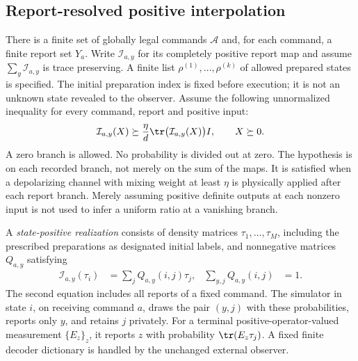 \subsection{Report-resolved positive interpolation}
There is a finite set of globally legal commands $\mathcal A$ and, for each command, a finite report set $Y_a$. Write $\mathcal I_{a,y}$ for its completely positive report map and assume $\sum_y\mathcal I_{a,y}$ is trace preserving. A finite list $\rho^{(1)},\ldots,\rho^{(k)}$ of allowed prepared states is specified. The initial preparation index is fixed before execution; it is not an unknown state revealed to the observer. Assume the following unnormalized inequality for every command, report and positive input:
\begin{equation}\label{eq:r68-branch-floor}
 \mathcal I_{a,y}(X)\succeq
       \frac{\eta}{d}\tr\bigl(\mathcal I_{a,y}(X)\bigr)I,
 \qquad X\succeq0.
\end{equation}
A zero branch is allowed. No probability is divided out at zero. The hypothesis is on each recorded branch, not merely on the sum of the maps. It is satisfied when a depolarizing channel with mixing weight at least $\eta$ is physically applied after each report branch. Merely assuming positive definite outputs at each nonzero input is not used to infer a uniform ratio at a vanishing branch.

A \emph{state-positive realization} consists of density matrices $\tau_1,\ldots,\tau_M$, including the prescribed preparations as designated initial labels, and nonnegative matrices $Q_{a,y}$ satisfying
\begin{align}
 \mathcal I_{a,y}(\tau_i)&=\sum_jQ_{a,y}(i,j)\tau_j,
       &\sum_{y,j}Q_{a,y}(i,j)&=1.\label{eq:r68-intertwining}
\end{align}
The second equation includes all reports of a fixed command. The simulator in state $i$, on receiving command $a$, draws the pair $(y,j)$ with these probabilities, reports only $y$, and retains $j$ privately. For a terminal positive-operator-valued measurement $\{E_z\}_z$, it reports $z$ with probability $\tr(E_z\tau_j)$. A fixed finite decoder dictionary is handled by the unchanged external observer.

